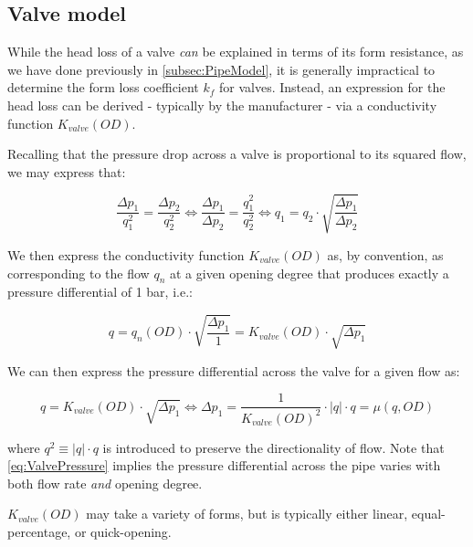 \subsection{Valve model}\label{subsec:ValveModel}

While the head loss of a valve \textit{can} be explained in terms of its form resistance, as we have done previously in \cref{subsec:PipeModel}, it is generally impractical to determine the form loss coefficient $k_f$ for valves. Instead, an expression for the head loss can be derived - typically by the manufacturer - via a conductivity function $K_{valve}(OD)$.

\smallskip

Recalling that the pressure drop across a valve is proportional to its squared flow, we may express that:

\begin{equation}\label{eq:HydrodynamicRatio}
	\frac{\Delta p_1}{q_1^2} = \frac{\Delta p_2}{q_2^2} \Leftrightarrow 
	\frac{\Delta p_1}{\Delta p_2} = \frac{q_1^2}{q_2^2}
	\Leftrightarrow
	q_1 = q_2\cdot\sqrt{\frac{\Delta p_1}{\Delta p_2}}
\end{equation}

We then express the conductivity function $K_{valve}(OD)$ as, by convention, as corresponding to the flow $q_n$ at a given opening degree that produces exactly a pressure differential of 1 bar, i.e.:

\begin{equation}\label{eq:Kvalve}
	q = q_n(OD)\cdot\sqrt{\frac{\Delta p_1}{1}} = K_{valve}(OD)\cdot\sqrt{\Delta p_1}
\end{equation}

We can then express the pressure differential across the valve for a given flow as:

\begin{equation}\label{eq:ValvePressure}
	 q = K_{valve}(OD)\cdot\sqrt{\Delta p_1}
	 \Leftrightarrow
	 \Delta p_1 = \frac{1}{K_{valve}(OD)^2} \cdot |q|\cdot q = \mu(q,OD)
\end{equation}

where $q^2 \equiv |q|\cdot q$ is introduced to preserve the directionality of flow. Note that \cref{eq:ValvePressure} implies the pressure differential across the pipe varies with both flow rate \textit{and} opening degree.

\smallskip

$K_{valve}(OD)$ may take a variety of forms, but is typically either linear, equal-percentage, or quick-opening.

